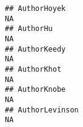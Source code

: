 \documentclass[]{article}
\begin{document}
\begin{verbatim}
## AuthorHoyek                                                                                                                                                                                                                                                                                                                                                                                                                                                                             NA
## AuthorHu                                                                                                                                                                                                                                                                                                                                                                                                                                                                                NA
## AuthorKeedy                                                                                                                                                                                                                                                                                                                                                                                                                                                                             NA
## AuthorKhot                                                                                                                                                                                                                                                                                                                                                                                                                                                                              NA
## AuthorKnobe                                                                                                                                                                                                                                                                                                                                                                                                                                                                             NA
## AuthorLevinson                                                                                                                                                                                                                                                                                                                                                                                                                                                                          NA

\end{verbatim}
\end{document}
